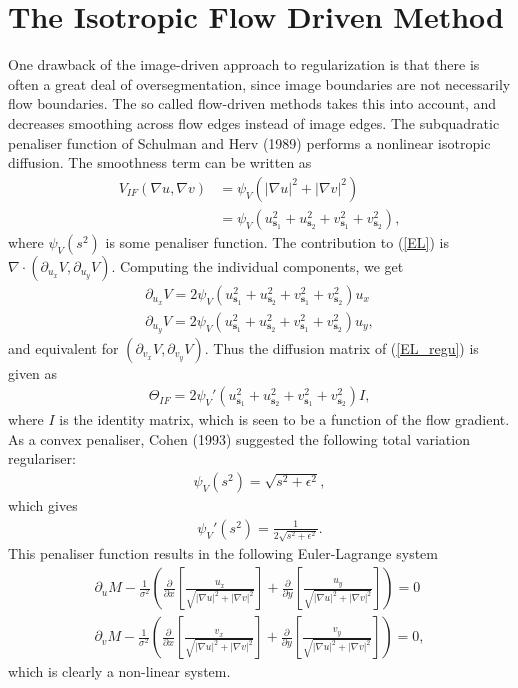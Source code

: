 \chapter{The Isotropic Flow Driven Method}
One drawback of the image-driven approach to regularization is that there is often a great deal of oversegmentation, since image boundaries are not necessarily flow boundaries. The so called flow-driven methods takes this into account, and decreases smoothing across flow edges instead of image edges. The subquadratic penaliser function of Schulman and Herv (1989) performs a nonlinear isotropic diffusion. The smoothness term can be written as
\begin{align*}
V_{IF}(\nabla u, \nabla v) &= \psi_V \left( |\nabla u|^2 + |\nabla v|^2 \right) \\ 
&= \psi_V \left( u_{\textbf{s}_1}^2 + u_{\textbf{s}_2}^2 + v_{\textbf{s}_1}^2 + v_{\textbf{s}_2}^2 \right),
\end{align*} 
where $\psi_V(s^2)$ is some penaliser function. The contribution to (\ref{EL}) is $\nabla \cdot (\partial_{u_x} V, \partial_{u_y} V)$. Computing the individual components, we get
\begin{align*}
\partial_{u_x} V = 2 \psi_V \left( u_{\textbf{s}_1}^2 + u_{\textbf{s}_2}^2 + v_{\textbf{s}_1}^2 + v_{\textbf{s}_2}^2 \right) u_x \\
\partial_{u_y} V = 2 \psi_V \left( u_{\textbf{s}_1}^2 + u_{\textbf{s}_2}^2 + v_{\textbf{s}_1}^2 + v_{\textbf{s}_2}^2 \right) u_y,
\end{align*}
and equivalent for $(\partial_{v_x} V, \partial_{v_y} V)$. Thus the diffusion matrix of (\ref{EL_regu}) is given as
\begin{align*}
\Theta_{IF} = 2 \psi_V'\left( u_{\textbf{s}_1}^2 + u_{\textbf{s}_2}^2 + v_{\textbf{s}_1}^2 + v_{\textbf{s}_2}^2 \right) I,
\end{align*}
where $I$ is the identity matrix, which is seen to be a function of the flow gradient. As a convex penaliser, Cohen (1993) suggested the following total variation regulariser:
\begin{align*}
\psi_V(s^2) = \sqrt{s^2 + \epsilon^2},
\end{align*} 
which gives
\begin{align*}
\psi_V'(s^2) = \frac{1}{2 \sqrt{s^2 + \epsilon^2}}.
\end{align*}
This penaliser function results in the following Euler-Lagrange system
\begin{equation}
\begin{aligned}
\label{EL_LD}
\partial_u M - \frac{1}{\sigma^2} \left(\frac{\partial}{\partial x}\left[ \frac{u_x}{\sqrt{|\nabla u|^2 + |\nabla v|^2}} \right] + \frac{\partial}{\partial y} \left[ \frac{u_y}{\sqrt{|\nabla u|^2 + |\nabla v|^2}} \right] \right) = 0 \\
\partial_v M - \frac{1}{\sigma^2} \left(\frac{\partial}{\partial x}\left[ \frac{v_x}{\sqrt{|\nabla u|^2 + |\nabla v|^2}} \right] + \frac{\partial}{\partial y} \left[ \frac{v_y}{\sqrt{|\nabla u|^2 + |\nabla v|^2}} \right] \right) = 0,
\end{aligned}
\end{equation}
which is clearly a non-linear system. \cite{LaggedDiff}


